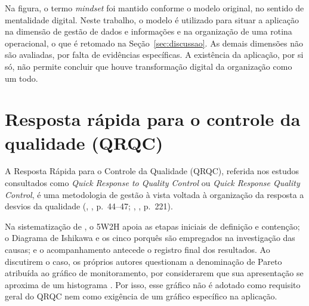 \begin{figure}[htb]
{%
    }
\end{figure}

Na figura, o termo \textit{mindset} foi mantido conforme o modelo original, no sentido de mentalidade digital. Neste trabalho, o modelo é utilizado para situar a aplicação na dimensão de gestão de dados e informações e na organização de uma rotina operacional, o que é retomado na Seção~\ref{sec:discussao}. As demais dimensões não são avaliadas, por falta de evidências específicas. A existência da aplicação, por si só, não permite concluir que houve transformação digital da organização como um todo.


\section{Resposta rápida para o controle da qualidade (QRQC)}
\label{sec:qrqc}

A Resposta Rápida para o Controle da Qualidade (QRQC), referida nos estudos consultados como \textit{Quick Response to Quality Control} ou \textit{Quick Response Quality Control}, é uma metodologia de gestão à vista voltada à organização da resposta a desvios da qualidade (\citeauthor{rocha2012}, \citeyear{rocha2012}, p.~44--47; \citeauthor{moreira2023}, \citeyear{moreira2023}, p.~221).

Na sistematização de , o 5W2H apoia as etapas iniciais de definição e contenção; o Diagrama de Ishikawa e os cinco porquês são empregados na investigação das causas; e o acompanhamento antecede o registro final dos resultados. Ao discutirem o caso, os próprios autores questionam a denominação de Pareto atribuída ao gráfico de monitoramento, por considerarem que sua apresentação se aproxima de um histograma \cite[p.~53]{rocha2012}. Por isso, esse gráfico não é adotado como requisito geral do QRQC nem como exigência de um gráfico específico na aplicação.

